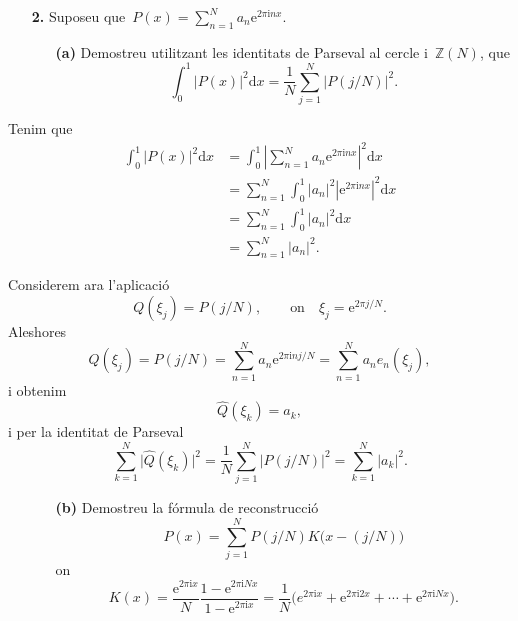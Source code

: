 \documentclass[a4paper]{article}
\theoremstyle{plain}
\theoremstyle{definition}
\newcommand{\iu}{\mathrm{i}}
\newcommand{\e}{\mathrm{e}}
\providecommand{\uppi}{\pi}
\newcommand{\diff}{\mathrm{d}}
\newcommand{\abs}[1]{\lvert{#1}\rvert}
\newcommand{\Abs}[1]{\left\lvert{#1}\right\rvert}
\newcommand{\ZZ}{\mathbb{Z}}
\begin{document}
\clearpage

\begin{enumerate}
    \item[\textbf{2.}] Suposeu
        que~\(\displaystyle P(x)=\sum_{n=1}^{N}a_{n}\e^{2\uppi\iu nx}\).
        \begin{enumerate}
            \item[\textbf{(a)}] Demostreu utilitzant les identitats de Parseval
                al cercle i~\(\ZZ(N)\), que
                \[
                    \int_{0}^{1}
                    \abs{P(x)}^{2}
                    \diff x
                    =
                    \frac{1}{N}
                    \sum_{j=1}^{N}
                    \abs{P(j/N)}^{2}.
                \]
        \end{enumerate}
\end{enumerate}

Tenim que
\begin{align*}
    \int_{0}^{1}
    \abs{P(x)}^{2}
    \diff x
    &=
    \int_{0}^{1}
    \Abs{
        \sum_{n=1}^{N}
        a_{n}\e^{2\uppi\iu nx}
    }^{2}
    \diff x \\
    &=
    \sum_{n=1}^{N}
    \int_{0}^{1}
    \abs{a_{n}}^{2}
    \Abs{
        \e^{2\uppi\iu nx}
    }^{2}
    \diff x \\
    &=
    \sum_{n=1}^{N}
    \int_{0}^{1}
    \abs{a_{n}}^{2}
    \diff x \\
    &=
    \sum_{n=1}^{N}
    \abs{a_{n}}^{2}.
\end{align*}

Considerem ara l'aplicació
\[
    Q(\xi_{j}) = P(j/N),
    \qquad
    \text{on}
    \quad
    \xi_{j} = \e^{2\uppi j/N}.
\]
Aleshores
\[
    Q(\xi_{j})
    =
    P(j/N)
    =
    \sum_{n=1}^{N}
    a_{n}
    \e^{2\uppi\iu nj/N}
    =
    \sum_{n=1}^{N}
    a_{n}
    e_{n}(\xi_{j}),
\]
i obtenim
\[
    \widehat{Q}(\xi_{k}) = a_{k},
\]
i per la identitat de Parseval
\[
    \sum_{k=1}^{N}
    \abs{\widehat{Q}(\xi_{k})}^{2}
    =
    \frac{1}{N}
    \sum_{j=1}^{N}
    \abs{P(j/N)}^{2}
    =
    \sum_{k=1}^{N}\abs{a_{k}}^{2}.
\]

\begin{enumerate}
    \item[]\begin{enumerate}
        \item[\textbf{(b)}] Demostreu la fórmula de reconstrucció
            \[
                P(x)
                =
                \sum_{j=1}^{N}
                P(j/N)
                K\bigl(x-(j/N)\bigr)
            \]
            on
            \[
                K(x)
                =
                \frac{\e^{2\uppi\iu x}}{N}
                \frac{1-\e^{2\uppi\iu Nx}}{1-\e^{2\uppi\iu x}}
                =
                \frac{1}{N}
                \bigl(
                    e^{2\uppi\iu x}
                    +
                    \e^{2\uppi\iu2x}
                    + \cdots +
                    \e^{2\uppi\iu Nx}
                \bigr).
            \]
    \end{enumerate}
\end{enumerate}
\end{document}

